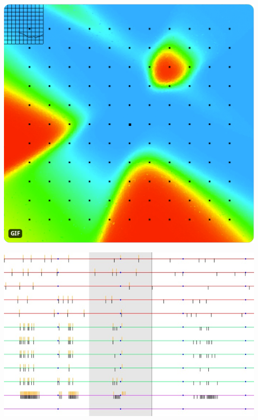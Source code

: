 \documentclass[../r.tex]{subfiles}
\begin{document}
\href{https://twitter.com/randompast/status/718903342773116928}{\includegraphics[scale=0.15]{../scientific/mlp.png}}

\includegraphics[scale=0.45]{../scientific/preview_7-22-17.jpg} 

\newpage
\end{document}
